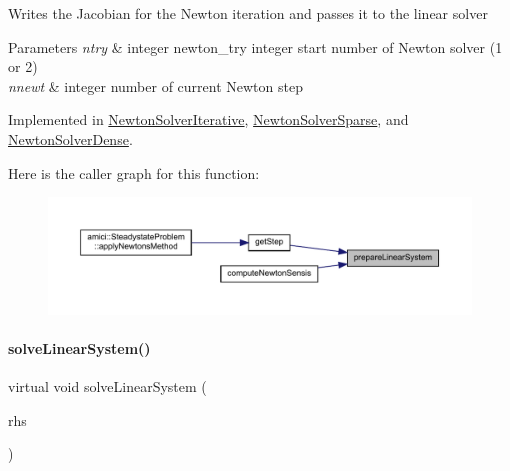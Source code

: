Writes the Jacobian for the Newton iteration and passes it to the linear solver


\begin{DoxyParams}{Parameters}
{\em ntry} & integer newton\+\_\+try integer start number of Newton solver (1 or 2) \\
\hline
{\em nnewt} & integer number of current Newton step \\
\hline
\end{DoxyParams}


Implemented in \mbox{\hyperlink{classamici_1_1_newton_solver_iterative_a0b900656d018299b08d0f027e95bd347}{Newton\+Solver\+Iterative}}, \mbox{\hyperlink{classamici_1_1_newton_solver_sparse_a0b900656d018299b08d0f027e95bd347}{Newton\+Solver\+Sparse}}, and \mbox{\hyperlink{classamici_1_1_newton_solver_dense_a0b900656d018299b08d0f027e95bd347}{Newton\+Solver\+Dense}}.

Here is the caller graph for this function\+:
\nopagebreak
\begin{figure}[H]
\begin{center}
\leavevmode
\includegraphics[width=350pt]{classamici_1_1_newton_solver_a4aed46b0343374f171f9b4b51fa009e7_icgraph}
\end{center}
\end{figure}
\mbox{\label{classamici_1_1_newton_solver_a761a5dc9e8cc7adfd4a392421df17c3d}} 
\paragraph{\texorpdfstring{solveLinearSystem()}{solveLinearSystem()}}
{\footnotesize\ttfamily virtual void solve\+Linear\+System (\begin{DoxyParamCaption}\item[{\mbox{\hyperlink{classamici_1_1_ami_vector}{Ami\+Vector}} $\ast$}]{rhs }\end{DoxyParamCaption})\hspace{0.3cm}{\ttfamily [pure virtual]}}

